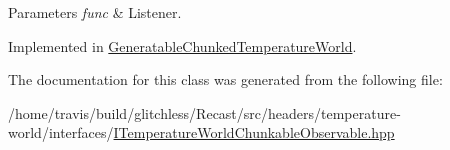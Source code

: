 \begin{DoxyParams}{Parameters}
{\em func} & Listener. \\
\hline
\end{DoxyParams}


Implemented in \hyperlink{class_generatable_chunked_temperature_world_a4416f9f9ea400e540b1214b053692760}{Generatable\-Chunked\-Temperature\-World}.



The documentation for this class was generated from the following file\-:\begin{DoxyCompactItemize}
\item 
/home/travis/build/glitchless/\-Recast/src/headers/temperature-\/world/interfaces/\hyperlink{_i_temperature_world_chunkable_observable_8hpp}{I\-Temperature\-World\-Chunkable\-Observable.\-hpp}\end{DoxyCompactItemize}

